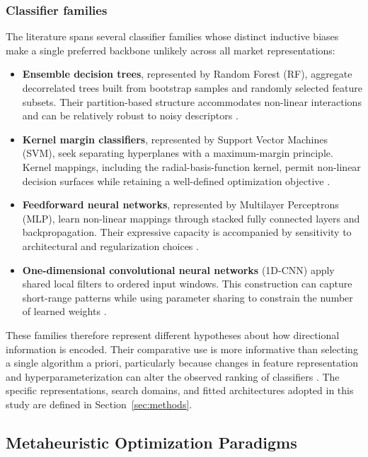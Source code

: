 \subsubsection{Classifier families}

The literature spans several classifier families whose distinct inductive biases make a single preferred backbone unlikely across all market representations:
\begin{itemize}
    \item \textbf{Ensemble decision trees}, represented by Random Forest (RF), aggregate decorrelated trees built from bootstrap samples and randomly selected feature subsets. Their partition-based structure accommodates non-linear interactions and can be relatively robust to noisy descriptors \cite{nabipour2020predicting}.
    \item \textbf{Kernel margin classifiers}, represented by Support Vector Machines (SVM), seek separating hyperplanes with a maximum-margin principle. Kernel mappings, including the radial-basis-function kernel, permit non-linear decision surfaces while retaining a well-defined optimization objective \cite{naik2019optimal}.
    \item \textbf{Feedforward neural networks}, represented by Multilayer Perceptrons (MLP), learn non-linear mappings through stacked fully connected layers and backpropagation. Their expressive capacity is accompanied by sensitivity to architectural and regularization choices \cite{ecer2020mlp_ga_pso}.
    \item \textbf{One-dimensional convolutional neural networks} (1D-CNN) apply shared local filters to ordered input windows. This construction can capture short-range patterns while using parameter sharing to constrain the number of learned weights \cite{bandgar2025finchronos, dhingra2025solar}.
\end{itemize}

These families therefore represent different hypotheses about how directional information is encoded. Their comparative use is more informative than selecting a single algorithm a priori, particularly because changes in feature representation and hyperparameterization can alter the observed ranking of classifiers \cite{nabipour2020predicting, mutinda2026hybrid}. The specific representations, search domains, and fitted architectures adopted in this study are defined in Section~\ref{sec:methods}.

\subsection{Metaheuristic Optimization Paradigms}\label{subsec:metaheuristic_paradigms}

